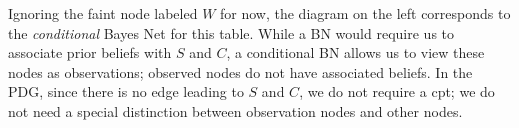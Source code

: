 \documentclass{article}
\newcommand{\MN}{PDG}
\newcommand{\MNs}{\MN s}
\numberwithin{equation}{section}
\begin{document}
\begin{notfocus}
\begin{example}
		Ignoring the faint node labeled $W$ for now, the diagram on the left
		corresponds to the \emph{conditional} Bayes Net \parencite{koller2009probabilistic} for this table.
		While a BN would require us to associate prior beliefs with $S$ and
		$C$, a conditional BN allows us to view these nodes as
		observations; observed nodes do not have associated beliefs.
		In the \MN, since there is no edge leading to $S$ and $C$, we
		do not require a cpt; we do not need a special distinction between
		observation nodes and other nodes.
				

\end{example}
\end{notfocus}
\end{document}
